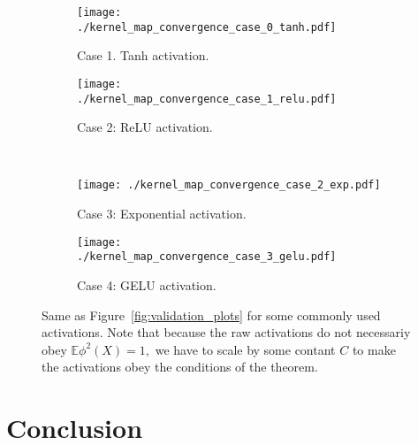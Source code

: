 \documentclass[twoside]{article}
\newcommand{\E}{\mathbb{E}}
\theoremstyle{definition}
\begin{document}
\begin{figure*}[ht!]
    \centering
    \begin{subfigure}[b]{0.7\textwidth}
        \centering
        \texttt{[image: ./kernel\_map\_convergence\_case\_0\_tanh.pdf]}
        \caption{\small Case 1. Tanh activation.}
    \end{subfigure}
    \hfill
    \begin{subfigure}[b]{0.7\textwidth}
        \centering
        \texttt{[image: ./kernel\_map\_convergence\_case\_1\_relu.pdf]}
        \caption{\small Case 2: ReLU activation.}
    \end{subfigure}
    \\
    \begin{subfigure}[b]{0.7\textwidth}
        \centering
        \texttt{[image: ./kernel\_map\_convergence\_case\_2\_exp.pdf]}
        \caption{\small Case 3: Exponential activation.} 
    \end{subfigure}
    \hfill
    \begin{subfigure}[b]{0.7\textwidth}
        \centering
        \texttt{[image: ./kernel\_map\_convergence\_case\_3\_gelu.pdf]}
        \caption{\small Case 4: GELU activation.}
    \end{subfigure}
    \caption{\small Same as Figure~\ref{fig:validation_plots} for some commonly used activations. Note that because the raw activations do not necessariy obey $\E \phi^2(X)=1,$ we have to scale by some contant $C$ to make the activations obey the conditions of the theorem.}
    \label{fig:validation_plots_real_activations}
\end{figure*}

\section{Conclusion}



\end{document}
